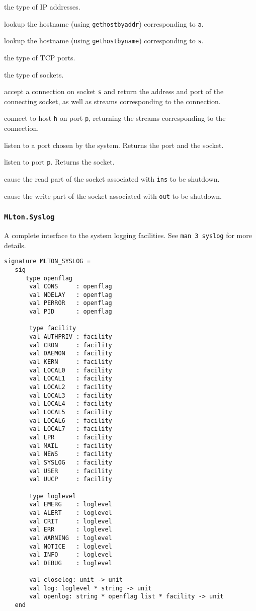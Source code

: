 \begin{description}

the type of IP addresses.

lookup the hostname (using {\tt gethostbyaddr}) corresponding to {\tt a}.

lookup the hostname (using {\tt gethostbyname}) corresponding to {\tt s}.

the type of TCP ports.

the type of sockets.

accept a connection on socket {\tt s} and return the address and
port of the connecting socket, as well as streams corresponding to the
connection.

connect to host {\tt h} on port {\tt p}, returning the streams
corresponding to the connection.

listen to a port chosen by the system.  Returns the port and the socket.

listen to port {\tt p}.  Returns the socket.

cause the read part of the socket associated with {\tt ins} to be shutdown.

cause the write part of the socket associated with {\tt out} to be shutdown.
\end{description}

\subsubsection{\tt MLton.Syslog}
A complete interface to the system logging facilities.  See {\tt man 3 syslog}
for more details.
\begin{verbatim}
signature MLTON_SYSLOG =
   sig
      type openflag
       val CONS     : openflag
       val NDELAY   : openflag
       val PERROR   : openflag
       val PID      : openflag
   
       type facility
       val AUTHPRIV : facility
       val CRON     : facility
       val DAEMON   : facility
       val KERN     : facility
       val LOCAL0   : facility
       val LOCAL1   : facility
       val LOCAL2   : facility
       val LOCAL3   : facility
       val LOCAL4   : facility
       val LOCAL5   : facility
       val LOCAL6   : facility
       val LOCAL7   : facility
       val LPR      : facility
       val MAIL     : facility
       val NEWS     : facility
       val SYSLOG   : facility
       val USER     : facility
       val UUCP     : facility
   
       type loglevel
       val EMERG    : loglevel
       val ALERT    : loglevel
       val CRIT     : loglevel
       val ERR      : loglevel
       val WARNING  : loglevel
       val NOTICE   : loglevel
       val INFO     : loglevel
       val DEBUG    : loglevel
   
       val closelog: unit -> unit
       val log: loglevel * string -> unit
       val openlog: string * openflag list * facility -> unit
   end
\end{verbatim}

